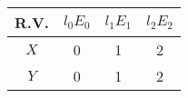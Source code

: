 
\begin{center}
\begin{tabular}{|c|c|c|c|}
\hline
\textbf{R.V.}& \textbf{$l_0E_0$} & \textbf{$l_1E_1$} & \textbf{$l_2E_2$} \\ \hline
$X$		   	&   0      & 1         &  2\\ \hline
$Y$ 		&	0      & 1        &  2 \\ \hline
\end{tabular}
\end{center}
